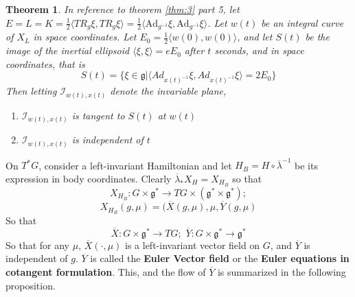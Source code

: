 \documentclass{article}
\newtheorem{thm}{Theorem}
\begin{document}
\begin{thm}

In reference to theorem \ref{thm:3} part 5, let $E=L=K=\frac{1}{2}\langle TR_g \xi, TR_g \xi \rangle = \frac{1}{2}\langle \mathrm{Ad}_{g^{-1}} \xi, \mathrm{Ad}_{g^{-1}} \xi \rangle$. Let $w(t)$ be an integral curve of $X_L$ in space coordinates. Let $E_0 = \frac{1}{2}\langle w(0), w(0) \rangle$, and let $S(t)$ be the image of the inertial ellipsoid $\langle \xi, \xi \rangle = e E_0$ after $t$ seconds, and in space coordinates, that is 
\begin{equation}S(t) = \{ \xi \in \mathfrak{g} \vert \langle Ad_{x(t)^{-1}} \xi, Ad_{x(t)^{-1}} \xi \rangle = 2 E_0 \}\end{equation}
Then letting $\mathcal{I}_{w(t), x(t)}$ denote the invariable plane,
\begin{enumerate}
    \item $\mathcal{I}_{w(t),x(t)}$ is tangent to $S(t)$ at $w(t)$
    \item $\mathcal{I}_{w(t),x(t)}$ is independent of $t$
\end{enumerate}
\end{thm}

On $T^*G$, consider a left-invariant Hamiltonian and let $H_B = H \circ \overline{\lambda}^{-1}$ be its expression in body coordinates. Clearly $\overline{\lambda}_* X_H = X_{H_B}$ so that 
\begin{equation}X_{H_B}: G \times \mathfrak{g}^* \to TG \times (\mathfrak{g}^* \times \mathfrak{g}^*); \end{equation}
\begin{equation}X_{H_B}(g, \mu) = (\overline{X}(g,\mu), \mu, \overline{Y}(g,\mu)\end{equation}
So that
\begin{equation}\overline{X}:G \times \mathfrak{g}^* \to TG; \hspace{4pt} \overline{Y}: G \times \mathfrak{g}^* \to \mathfrak{g}^*\end{equation}
So that for any $\mu$, $\overline{X}(\cdot, \mu)$ is a left-invariant vector field on $G$, and $\overline{Y}$ is independent of $g$. $\overline{Y}$ is called the \textbf{Euler Vector field} or the \textbf{Euler equations in cotangent formulation}. This, and the flow of $\overline{Y}$ is summarized in the following proposition.
\end{document}
